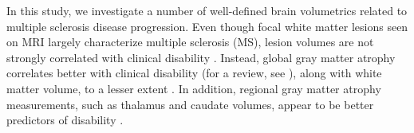 In this study, we investigate a number of well-defined brain volumetrics related to multiple sclerosis disease progression. Even though focal white matter lesions seen on MRI largely characterize multiple sclerosis (MS), lesion volumes are not strongly correlated with clinical disability \cite{lesions1,lesions2,lesions3}. Instead, global gray matter atrophy correlates better with clinical disability (for a review, see \cite{horakova2012clinical}), along with white matter volume, to a lesser extent \cite{white1}. In addition, regional gray matter atrophy measurements, such as thalamus \cite{thal1,thal2,thal3,thal4} and caudate \cite{caud1,caud2} volumes, appear to be better predictors of disability \cite{gm1,gm2,gm3,gm4}.   %